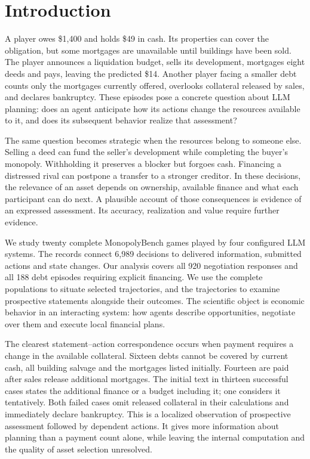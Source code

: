 \section{Introduction}

A player owes \$1,400 and holds \$49 in cash. Its properties can cover the obligation, but some mortgages are unavailable until buildings have been sold. The player announces a liquidation budget, sells its development, mortgages eight deeds and pays, leaving the predicted \$14. Another player facing a smaller debt counts only the mortgages currently offered, overlooks collateral released by sales, and declares bankruptcy. These episodes pose a concrete question about LLM planning: does an agent anticipate how its actions change the resources available to it, and does its subsequent behavior realize that assessment?

The same question becomes strategic when the resources belong to someone else. Selling a deed can fund the seller's development while completing the buyer's monopoly. Withholding it preserves a blocker but forgoes cash. Financing a distressed rival can postpone a transfer to a stronger creditor. In these decisions, the relevance of an asset depends on ownership, available finance and what each participant can do next. A plausible account of those consequences is evidence of an expressed assessment. Its accuracy, realization and value require further evidence.

We study twenty complete MonopolyBench games played by four configured LLM systems. The records connect 6,989 decisions to delivered information, submitted actions and state changes. Our analysis covers all 920 negotiation responses and all 188 debt episodes requiring explicit financing. We use the complete populations to situate selected trajectories, and the trajectories to examine prospective statements alongside their outcomes. The scientific object is economic behavior in an interacting system: how agents describe opportunities, negotiate over them and execute local financial plans.

The clearest statement--action correspondence occurs when payment requires a change in the available collateral. Sixteen debts cannot be covered by current cash, all building salvage and the mortgages listed initially. Fourteen are paid after sales release additional mortgages. The initial text in thirteen successful cases states the additional finance or a budget including it; one considers it tentatively. Both failed cases omit released collateral in their calculations and immediately declare bankruptcy. This is a localized observation of prospective assessment followed by dependent actions. It gives more information about planning than a payment count alone, while leaving the internal computation and the quality of asset selection unresolved.

